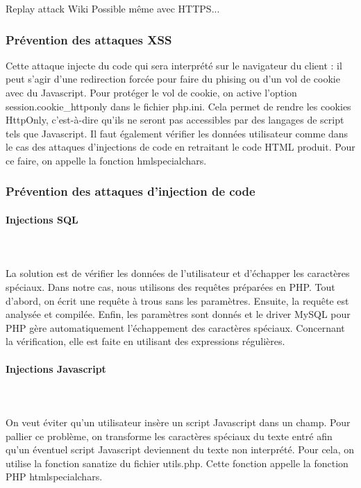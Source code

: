 \documentclass[a4paper]{article}
\begin{document}
		Replay attack Wiki
		Possible même avec HTTPS...
 		
 		\subsubsection{Prévention des attaques XSS}
 		
Cette attaque injecte du code qui sera interprété sur le navigateur du client : il peut s'agir d'une redirection forcée pour faire 
du phising ou d'un vol de cookie avec du Javascript.
Pour protéger le vol de cookie, on active l'option session.cookie\_httponly dans le fichier php.ini.
Cela permet de rendre les cookies HttpOnly, c'est-à-dire qu'ils ne seront pas accessibles par des langages de script tels que Javascript.
Il faut également vérifier les données utilisateur comme dans le cas des attaques d'injections de code en retraitant le code
HTML produit. Pour ce faire, on appelle la fonction hmlspecialchars.
 		
		\subsubsection{Prévention des attaques d'injection de code}
		
\paragraph{Injections SQL}
~~\\
\\
La solution est de vérifier les données de l'utilisateur et d'échapper les caractères spéciaux.
Dans notre cas, nous utilisons des requêtes préparées en PHP.
Tout d'abord, on écrit une requête à trous sans les paramètres.
Ensuite, la requête est analysée et compilée.
Enfin, les paramètres sont donnés et le driver MySQL pour PHP gère automatiquement l'échappement des caractères spéciaux.
Concernant la vérification, elle est faite en utilisant des expressions régulières.			
		
\paragraph{Injections Javascript}
~~\\
\\
On veut éviter qu'un utilisateur insère un script Javascript dans un champ.
Pour pallier ce problème, on transforme les caractères spéciaux du texte entré afin
qu'un éventuel script Javascript deviennent du texte non interprété.
Pour cela, on utilise la fonction sanatize du fichier utils.php. Cette fonction appelle
la fonction PHP htmlspecialchars.
		
\end{document}
